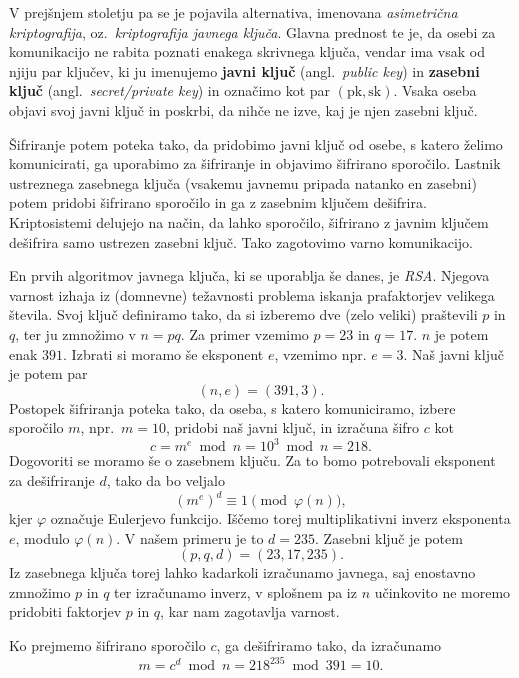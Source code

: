 \documentclass[isrm2, tisk]{fmfdelo}
\begin{document}
V prejšnjem stoletju pa se je pojavila alternativa, imenovana \textit{asimetrična kriptografija}, oz.\
\textit{kriptografija javnega ključa}. Glavna prednost te je, da osebi za komunikacijo ne rabita
poznati enakega skrivnega ključa, vendar ima vsak od njiju par ključev, ki ju imenujemo \textbf{javni
ključ} (angl.\ \textit{public key}) in \textbf{zasebni ključ} (angl.\ \textit{secret/private key}) in
označimo kot par $(\text{pk}, \text{sk})$. Vsaka oseba objavi svoj javni ključ in poskrbi, da nihče 
ne izve, kaj je njen zasebni ključ.

Šifriranje potem poteka tako, da pridobimo javni ključ od osebe, s katero želimo komunicirati, ga
uporabimo za šifriranje in objavimo šifrirano sporočilo. Lastnik ustreznega zasebnega ključa (vsakemu
javnemu pripada natanko en zasebni) potem pridobi šifrirano sporočilo in ga z zasebnim ključem
dešifrira. Kriptosistemi delujejo na način, da lahko sporočilo, šifrirano z javnim ključem dešifrira
samo ustrezen zasebni ključ. Tako zagotovimo varno komunikacijo.

\begin{primer}[RSA]
\label{primer:rsa}
    En prvih algoritmov javnega ključa, ki se uporablja še danes, je \textit{RSA}. Njegova varnost izhaja 
    iz (domnevne) težavnosti problema iskanja prafaktorjev velikega števila. Svoj ključ definiramo tako, 
    da si izberemo dve (zelo veliki) praštevili $p$ in $q$, ter ju zmnožimo v $n = pq$. Za primer vzemimo 
    $p = 23$ in  $q = 17$. $n$ je potem enak $391$. Izbrati si moramo še eksponent $e$, vzemimo npr. $e = 3$. 
    Naš javni ključ je potem par 
    $$ 
    (n, e) = (391, 3).
    $$
    Postopek šifriranja poteka tako, da oseba, s katero komuniciramo, izbere sporočilo $m$, npr.\ 
    $m = 10$, pridobi naš javni ključ, in izračuna šifro $c$ kot
    $$
    c = m^e \bmod{n} = 10^3 \bmod{n} = 218.
    $$
    Dogovoriti se moramo še o zasebnem ključu. Za to bomo potrebovali eksponent za dešifriranje $d$,
    tako da bo veljalo 
    $$
    (m^e)^d \equiv 1 \pmod{\varphi(n)},
    $$ 
    kjer $\varphi$ označuje Eulerjevo funkcijo. Iščemo torej multiplikativni inverz eksponenta 
    $e$, modulo $\varphi(n)$. V našem primeru je to $d = 235$. Zasebni ključ je potem 
    $$ 
    (p, q, d) = (23, 17, 235). 
    $$
    Iz zasebnega ključa torej lahko kadarkoli izračunamo javnega, saj enostavno zmnožimo $p$ in $q$ 
    ter izračunamo inverz, v splošnem pa iz $n$ učinkovito ne moremo pridobiti faktorjev $p$ in $q$,
    kar nam zagotavlja varnost.

    Ko prejmemo šifrirano sporočilo $c$, ga dešifriramo tako, da izračunamo
    $$
    m = c^d \bmod{n} = 218^{235} \bmod{391} = 10.   
    $$
\end{primer}
\end{document}
